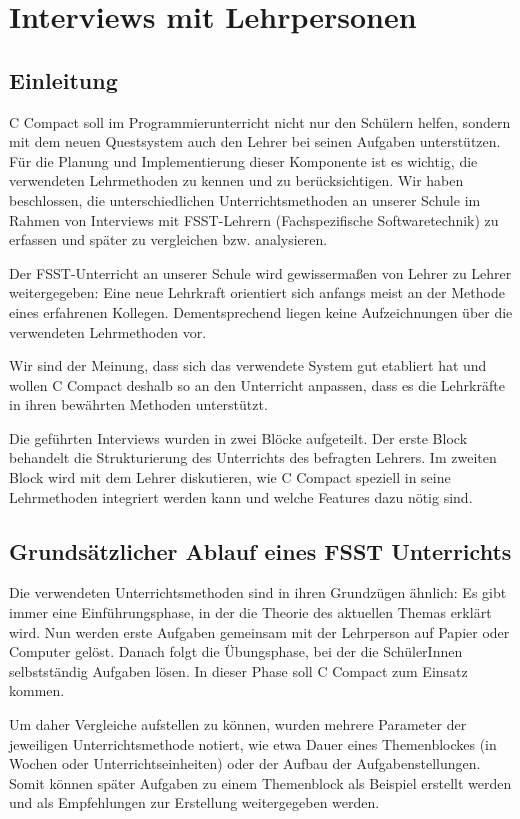 \section{Interviews mit Lehrpersonen}
\label{sec:sci-interview}

\subsection{Einleitung}
C Compact soll im Programmierunterricht nicht nur den Schülern helfen, sondern mit dem neuen Questsystem auch den Lehrer bei seinen Aufgaben unterstützen. Für die Planung und Implementierung dieser Komponente ist es wichtig, die verwendeten Lehrmethoden zu kennen und zu berücksichtigen. Wir haben beschlossen, die unterschiedlichen Unterrichtsmethoden an unserer Schule im Rahmen von Interviews mit FSST-Lehrern (Fachspezifische Softwaretechnik) zu erfassen und später zu vergleichen bzw. analysieren. 

Der FSST-Unterricht an unserer Schule wird gewissermaßen von Lehrer zu Lehrer weitergegeben:
Eine neue Lehrkraft orientiert sich anfangs meist an der Methode eines erfahrenen Kollegen. Dementsprechend liegen keine Aufzeichnungen über die verwendeten Lehrmethoden vor. 

Wir sind der Meinung, dass sich das verwendete System gut etabliert hat und wollen C Compact deshalb so an den Unterricht anpassen, dass es die Lehrkräfte in ihren bewährten Methoden unterstützt.

Die geführten Interviews wurden in zwei Blöcke aufgeteilt. Der erste Block behandelt die Strukturierung des Unterrichts des befragten Lehrers. Im zweiten Block wird mit dem Lehrer diskutieren, wie C Compact speziell in seine Lehrmethoden integriert werden kann und welche Features dazu nötig sind.

\subsection{Grundsätzlicher Ablauf eines FSST Unterrichts}
Die verwendeten Unterrichtsmethoden sind in ihren Grundzügen ähnlich: Es gibt immer eine Einführungsphase, in der die Theorie des aktuellen Themas erklärt wird. Nun werden erste Aufgaben gemeinsam mit der Lehrperson auf Papier oder Computer gelöst. Danach folgt die Übungsphase, bei der die SchülerInnen selbstständig Aufgaben lösen. In dieser Phase soll C Compact zum Einsatz kommen.

Um daher Vergleiche aufstellen zu können, wurden mehrere Parameter der jeweiligen Unterrichtsmethode notiert, wie etwa Dauer eines Themenblockes (in Wochen oder Unterrichtseinheiten) oder der Aufbau der Aufgabenstellungen. Somit können später Aufgaben zu einem Themenblock als Beispiel erstellt werden und als Empfehlungen zur Erstellung weitergegeben werden.

